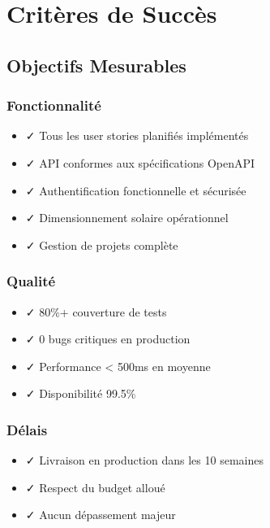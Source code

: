 \documentclass[12pt,a4paper,french]{report}
\begin{document}
\chapter{Critères de Succès}

\section{Objectifs Mesurables}

\subsection{Fonctionnalité}

\begin{itemize}
    \item ✓ Tous les user stories planifiés implémentés
    \item ✓ API conformes aux spécifications OpenAPI
    \item ✓ Authentification fonctionnelle et sécurisée
    \item ✓ Dimensionnement solaire opérationnel
    \item ✓ Gestion de projets complète
\end{itemize}

\subsection{Qualité}

\begin{itemize}
    \item ✓ 80\%+ couverture de tests
    \item ✓ 0 bugs critiques en production
    \item ✓ Performance < 500ms en moyenne
    \item ✓ Disponibilité 99.5\%
\end{itemize}

\subsection{Délais}

\begin{itemize}
    \item ✓ Livraison en production dans les 10 semaines
    \item ✓ Respect du budget alloué
    \item ✓ Aucun dépassement majeur
\end{itemize}
\end{document}
